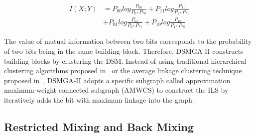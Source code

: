 \documentclass{sig-alternate-05-2015}
\begin{document}
\begin{equation} 
\begin{split}
I(X;Y) &= P_{00 }log\frac{P_{00}}{P_{0*} P_{*0}} + P_{11 }log\frac{P_{11}}{P_{1*} P_{*1}}  \\
	    &+ P_{01 }log\frac{P_{01}}{P_{0*} P_{*1}} + P_{10 }log\frac{P_{10}}{P_{1*} P_{*0}}  
\end{split}
\end{equation}


The value of mutual information between two bits corresponds to the probability of two bits being in the same building-block.
Therefore, DSMGA-II constructs building-blocks by clustering the DSM.
Instead of using traditional hierarchical clustering algorithms proposed in~\cite{thierens:LTGA} or the average linkage clustering technique proposed in~\cite{thierens:OM}, DSMGA-II adopts a specific subgraph called approximation maximum-weight connected subgraph (AMWCS) to construct the ILS by iteratively adds the bit with maximum linkage into the graph.






\subsection{Restricted Mixing and Back Mixing}
\end{document}
